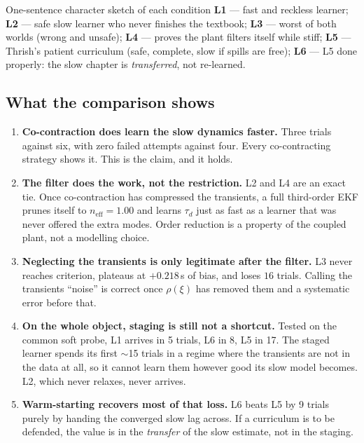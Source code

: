 \documentclass[11pt,a4paper]{article}
\newcommand{\neff}{n_{\mathrm{eff}}}
\begin{document}
\begin{examplebox}{One-sentence character sketch of each condition}
\textbf{L1} --- fast and reckless learner;\;
\textbf{L2} --- safe slow learner who never finishes the textbook;\;
\textbf{L3} --- worst of both worlds (wrong and unsafe);\;
\textbf{L4} --- proves the plant filters itself while stiff;\;
\textbf{L5} --- Thrish's patient curriculum (safe, complete, slow if spills
are free);\;
\textbf{L6} --- L5 done properly: the slow chapter is \emph{transferred}, not
re-learned.
\end{examplebox}

\subsection{What the comparison shows}

\begin{enumerate}[nosep]
\item \textbf{Co-contraction does learn the slow dynamics faster.} Three
  trials against six, with zero failed attempts against four. Every
  co-contracting strategy shows it. This is the claim, and it holds.
\item \textbf{The filter does the work, not the restriction.} L2 and L4 are
  an exact tie. Once co-contraction has compressed the transients, a full
  third-order EKF prunes itself to $\neff=1.00$ and learns $\tau_d$ just as
  fast as a learner that was never offered the extra modes. Order reduction
  is a property of the coupled plant, not a modelling choice.
\item \textbf{Neglecting the transients is only legitimate after the
  filter.} L3 never reaches criterion, plateaus at $+0.218$\,s of bias, and
  loses $16$ trials. Calling the transients ``noise'' is correct once
  $\rho(\xi)$ has removed them and a systematic error before that.
\item \textbf{On the whole object, staging is still not a shortcut.}
  Tested on the common soft probe, L1 arrives in 5 trials, L6 in 8, L5 in
  17. The staged learner spends its first $\sim$15 trials in a regime where
  the transients are not in the data at all, so it cannot learn them however
  good its slow model becomes. L2, which never relaxes, never arrives.
\item \textbf{Warm-starting recovers most of that loss.} L6 beats L5 by 9
  trials purely by handing the converged slow lag across. If a curriculum is
  to be defended, the value is in the \emph{transfer} of the slow estimate,
  not in the staging.
\end{enumerate}
\end{document}
